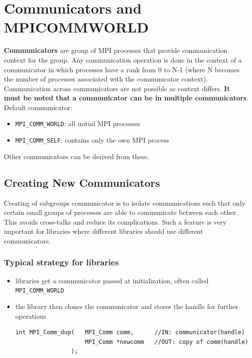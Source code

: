 \documentclass[12pt, a4paper]{report}
\begin{document}
\section{Communicators and MPI\textunderscore COMM\textunderscore WORLD}
{\bfseries{Communicators}} are group of MPI processes that provide communication context for the group. Any communication operation is done in the context of a
communicator in which processes have a rank from 0 to N-1 (where N becomes the number of processes associated with the communicator context). Communication across
communicators are not possible as context differs. {\bfseries{It must be noted that a communicator can be in multiple communicators}}.\\
Default communicator: 
\begin{itemize}
    \item \verb$MPI_COMM_WORLD$: all initial MPI processes
    \item \verb$MPI_COMM_SELF$: contains only the own MPI process
\end{itemize}
Other communicators can be derived from these.

\subsection{Creating New Communicators}
Creating of subgroups communicator is to isolate communications such that only certain small groups of processes are able to communicate between each other. 
This avoids cross-talks and reduce its complications. Such a feature is very important for libraries where different libraries should use different communicators.

\subsubsection{Typical strategy for libraries}
\begin{itemize}
    \item libraries get a communicator passed at initialization, often called \verb$MPI_COMM_WORLD$
    \item the library then clones the communicator and stores the handle for further operations
    \begin{verbatim}
int MPI_Comm_dup(   MPI_Comm comm,      //IN: communicator(handle)
                    MPI_Comm *newcomm   //OUT: copy of comm(handle)
                );
    \end{verbatim}
\end{itemize}
\end{document}

